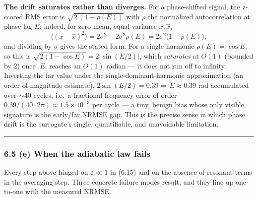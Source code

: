 \documentclass[
  11pt,
]{article}
\begin{document}
\textbf{The drift saturates rather than diverges.} For a phase-shifted
signal, the z-scored RMS error is \(\sqrt{2\,(1-\rho(E))}\) with
\(\rho\) the normalized autocorrelation at phase lag \(E\): indeed, for
zero-mean, equal-variance \(x,\hat x\), \[
\big\langle(x-\hat x)^2\big\rangle=2\sigma^2-2\sigma^2\rho(E)=2\sigma^2\big(1-\rho(E)\big),
\] and dividing by \(\sigma\) gives the stated form. For a single
harmonic \(\rho(E)=\cos E\), so this is
\(\sqrt{2(1-\cos E)}=2|\sin(E/2)|\), which \emph{saturates} at \(O(1)\)
(bounded by \(2\)) once \(|E|\) reaches an \(O(1)\) radian --- it does
not run off to infinity. Inverting the far value under the
single-dominant-harmonic approximation (an order-of-magnitude estimate),
\(2\sin(E/2)=0.39\Rightarrow E\approx0.39\) rad accumulated over
\(\sim40\) cycles, i.e.~a fractional frequency error of order
\(0.39/(40\cdot2\pi)\approx1.5\times10^{-3}\) per cycle --- a tiny,
benign bias whose only visible signature is the early/far NRMSE gap.
This is the precise sense in which phase drift is the surrogate's
single, quantifiable, and unavoidable limitation.

\begin{center}\rule{0.5\linewidth}{0.5pt}\end{center}

\subsubsection{6.5 (e) When the adiabatic law
fails}\label{e-when-the-adiabatic-law-fails}

Every step above hinged on \(\varepsilon\ll1\) in (6.15) and on the
absence of resonant terms in the averaging step. Three concrete failure
modes result, and they line up one-to-one with the measured NRMSE.
\end{document}
